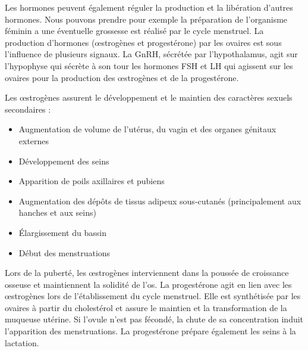 			Les hormones peuvent également réguler la production et la libération d'autres hormones.
			Nous pouvons prendre pour exemple la préparation de l'organisme féminin a une éventuelle grossesse est réalisé par le cycle menstruel.
			La production d'hormones ({\oe}strogènes et progestérone) par les ovaires est sous l'influence de plusieurs signaux.
			La GnRH, sécrétée par l'hypothalamus, agit sur l'hypophyse qui sécrète à son tour les hormones FSH et LH qui agissent sur les ovaires pour la production des {\oe}strogènes et de la progestérone.

			Les {\oe}strogènes assurent le développement et le maintien des caractères sexuels secondaires :
			\begin{itemize}
					\item   Augmentation de volume de l'utérus, du vagin et des organes génitaux externes
					\item   Développement des seins
					\item   Apparition de poils axillaires et pubiens
					\item   Augmentation des dépôts de tissus adipeux sous-cutanés (principalement aux hanches et aux seins)
					\item   Élargissement du bassin
					\item   Début des menstruations
			\end{itemize}

			Lors de la puberté, les {\oe}strogènes interviennent dans la poussée de croissance osseuse et maintiennent la solidité de l'os.
			La progestérone agit en lien avec les {\oe}strogènes lors de l'établissement du cycle menstruel.
			Elle est synthétisée par les ovaires à partir du cholestérol et assure le maintien et la transformation de la muqueuse utérine.
			Si l'ovule n'est pas fécondé, la chute de sa concentration induit l'apparition des menstruations.
			La progestérone prépare également les seins à la lactation.

\pagebreak



